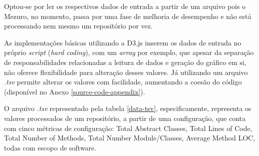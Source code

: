 Optou-se por ler os respectivos dados de entrada a partir de um arquivo pois o Mezuro, no momento, passa por uma fase de melhoria de desempenho e não está processando nem mesmo um repositório por vez.

As implementações básicas utilizando a D3.js inserem os dados de entrada no próprio \textit{script} (\textit{hard coding}), com um \textit{array} por exemplo, que apesar da separação de responsabilidades relacionadas a leitura de dados e geração do gráfico em si, não oferece flexibilidade para alteração desses valores. Já utilizando um arquivo \textit{.tsv} permite alterar os valores com facilidade, aumentando a coesão do código (disponível no Anexo \ref{source-code-appendix}). 

O arquivo \textit{.tsv} representado pela tabela \ref{data-tsv}, especificamente, representa os valores processados de um repositório, a partir de uma configuração, que conta com cinco métricas de configuração: Total Abstract Classes, Total Lines of Code, Total Number of Methods, Total Number Module/Classes, Average Method LOC, todas com escopo de software.